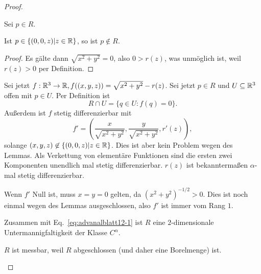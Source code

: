 \begin{proof}
	\begin{parts}
	\item Sei $p\in R$. 
\begin{tcolorbox}[title=Lemma]
	\begin{Lemma}
		Ist $p\in \{(0,0,z)|z\in \mathbb{R}\} $, so ist $p\not\in R$.
	\end{Lemma}
	\begin{proof}
		Es gälte dann $\sqrt{x^2+y^2} =0$, also $0>r(z)$, was unmöglich ist, weil $r(z)>0$ per Definition.
	\end{proof}
\end{tcolorbox}
Sei jetzt $f:\mathbb{R}^{3}\to \mathbb{R},f((x,y,z))=\sqrt{x^2+y^2} -r(z)$. Sei jetzt $p\in R$ und $U\subseteq \mathbb{R}^3$ offen mit $p\in U$. Per Definition ist
\begin{equation}\label{eq:advanalblatt12-1}
R\cap U=\{q\in U:f(q)=0\} 
.\end{equation}
Außerdem ist $f$ stetig differenzierbar mit
 \[
f'=\left( \frac{x}{\sqrt{x^2+y^2} }, \frac{y}{\sqrt{x^2+y^2} },r'(z) \right) 
,\]
solange $(x,y,z) \not\in \{(0,0,z)|z\in \mathbb{R}\} $. Dies ist aber kein Problem wegen des Lemmas. Als Verkettung von elementäre Funktionen sind die ersten zwei Komponenten unendlich mal stetig differenzierbar. $r(z)$ ist bekanntermaßen $\alpha$-mal stetig differenzierbar.

Wenn $f'$ Null ist, muss $x=y=0$ gelten, da $(x^2+y^2)^{-1 / 2}>0$. Dies ist noch einmal wegen des Lemmas ausgeschlossen, also $f'$ ist immer vom Rang $1$.

Zusammen mit Eq.~\eqref{eq:advanalblatt12-1} ist $R$ eine $2$-dimensionale Untermannigfaltigkeit der Klasse $C^\alpha$.
\item $R$ ist messbar, weil $R$ abgeschlossen (und daher eine Borelmenge) ist.


\end{parts}
\end{proof}
